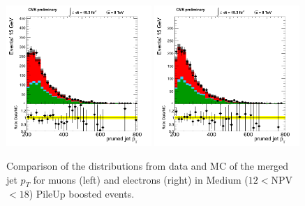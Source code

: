 \begin{figure}[h!t]
  {\centering
    \includegraphics[width=0.49\textwidth]{figs/puchecks/mu_MedNPV_GroomedJet_pt_pr.png}
    \includegraphics[width=0.49\textwidth]{figs/puchecks/el_MedNPV_GroomedJet_pt_pr.png}
    \caption{Comparison of the distributions from data and MC of the
    merged jet $p_T$ for muons (left) and electrons (right)
    in Medium ($12<$NPV$<18$) PileUp boosted events.}
\label{fig:pu_mergedjetptMed}}
\end{figure}
